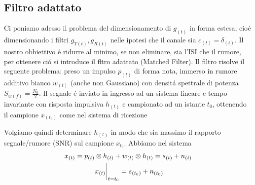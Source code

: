     \subsection{Filtro adattato}
        Ci poniamo adesso il problema del dimensionamento di $g_{(t)}$ in forma estesa, cioé
        dimensionando i filtri $g_{T(t)},g_{R(t)}$ nelle ipotesi che il canale sia $c_{(t)} = \delta_{(t)}$. 
        Il nostro obbiettivo é ridurre al minimo, se non eliminare, sia l'ISI che il rumore, per ottenere ció si introduce
        il fltro adattato (Matched Filter). Il filtro risolve il seguente problema: preso un impulso $p_{(t)}$ di forma nota,
        immerso in rumore additivo bianco $w_{(t)}$ (anche non Gaussiano) con densitá spettrale di potenza $S_{w(f)} = \frac{N_0}{2}$. 
        Il segnale é inviato in ingresso ad un sistema lineare e tempo invariante con risposta impulsiva $h_{(t)}$ e campionato ad un 
        istante $t_{0}$, ottenendo il campione $x_{(t_0)}$ come nel sistema di ricezione
        \begin{figure}[H]
            \centering
        \end{figure}        
        Volgiamo quindi determinare $h_{(t)}$ in modo che sia massimo il rapporto segnale/rumore (SNR) sul campione $x_{t_0}$. Abbiamo 
        nel sistema
        \begin{gather}
            x_{(t)} = p_{(t)}\otimes h_{(t)}+w_{(t)}\otimes h_{(t)} = s_{(t)}+ n_{(t)}\nonumber \\
            \eval*{x_{(t)}}_{t=t_0} = s_{(t_0)} + n_{(t_0)}\nonumber
        \end{gather}
